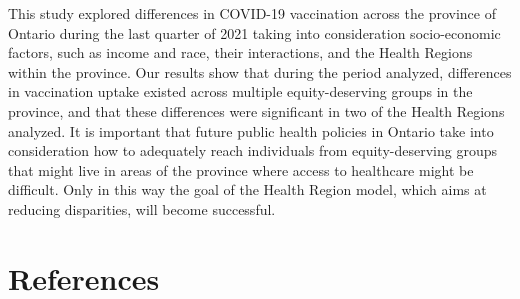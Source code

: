 \documentclass[
  letterpaper,
  DIV=11,
  numbers=noendperiod]{scrartcl}
\begin{document}
This study explored differences in COVID-19 vaccination across the
province of Ontario during the last quarter of 2021 taking into
consideration socio-economic factors, such as income and race, their
interactions, and the Health Regions within the province. Our results
show that during the period analyzed, differences in vaccination uptake
existed across multiple equity-deserving groups in the province, and
that these differences were significant in two of the Health Regions
analyzed. It is important that future public health policies in Ontario
take into consideration how to adequately reach individuals from
equity-deserving groups that might live in areas of the province where
access to healthcare might be difficult. Only in this way the goal of
the Health Region model, which aims at reducing disparities, will become
successful.

\hypertarget{references}{%
\section{References}\label{references}}
\end{document}
